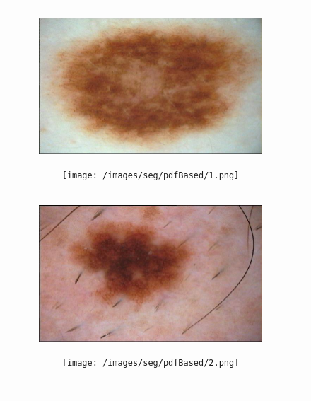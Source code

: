 \documentclass[a4paper, 10pt, conference]{ieeeconf}        %
\begin{document}
\begin{figure}[ht!]
 \centering
 \begin{tabular}{c c}
 \begin{subfigure}{0.2\textwidth}
 \includegraphics[scale=0.15]{original01.JPG}\caption{}
 \end{subfigure}
 \begin{subfigure}{0.2\textwidth}
 \texttt{[image: /images/seg/pdfBased/1.png]}\caption{}
 \end{subfigure}\\
 \begin{subfigure}{0.2\textwidth}
  \includegraphics[scale=0.15]{original02.JPG}\caption{}
  \end{subfigure}
  \begin{subfigure}{0.2\textwidth}
  \texttt{[image: /images/seg/pdfBased/2.png]}\caption{}
  \end{subfigure}\\
 \begin{subfigure}{0.2\textwidth}

\end{subfigure}
\end{tabular}
\end{figure}
\end{document}
